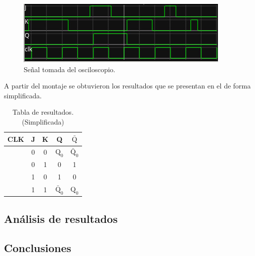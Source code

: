 \documentclass[journal, table]{IEEEtran}
\begin{document}
\begin{figure}[h!]
	\centering
	\includegraphics[width=0.8\linewidth]{./Discrete-FF/oscilloscope.jpeg}
	\caption{Señal tomada del osciloscopio.}
	\label{fig:jk-signal}
\end{figure}

A partir del montaje se obtuvieron los resultados que se presentan en el
 de forma simplificada.

\begin{table}[h!]
	\centering
	\begin{tabular}{c|c|c||c|c}
		\toprule
		CLK & J & K & Q & $\bar{\text{Q}}$ \\
		\midrule
		\RaisingEdge & 0 & 0 & $\text{Q}_{0}$ & $\bar{\text{Q}}_{0}$ \\
		\RaisingEdge & 0 & 1 & 0 & 1 \\
		\RaisingEdge & 1 & 0 & 1 & 0 \\
		\RaisingEdge & 1 & 1 & $\bar{\text{Q}}_{0}$ & $\text{Q}_{0}$ \\
		\bottomrule
	\end{tabular}
	\caption{Tabla de resultados. (Simplificada)}
	\label{tab:discrete-jk}
\end{table}

\subsection{Análisis de resultados}

\subsection{Conclusiones}

\printbibliography
\nocite{*}
\end{document}
